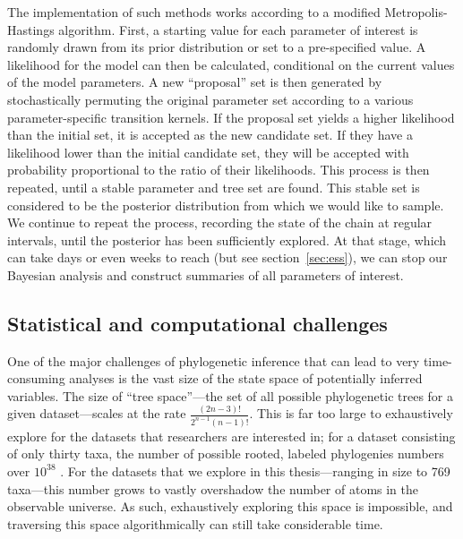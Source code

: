 The implementation of such methods works according to a modified Metropolis-Hastings algorithm. 
First, a starting value for each parameter of interest is randomly drawn from its prior distribution or set to a pre-specified value.
A likelihood for the model can then be calculated, conditional on the current values of the model parameters.
A new ``proposal'' set is then generated by stochastically permuting the original parameter set according to a various parameter-specific transition kernels.
If the proposal set yields a higher likelihood than the initial set, it is accepted as the new candidate set.
If they have a likelihood lower than the initial candidate set, they will be accepted with probability proportional to the ratio of their likelihoods.
This process is then repeated, until a stable parameter and tree set are found.
This stable set is considered to be the posterior distribution from which we would like to sample.
We continue to repeat the process, recording the state of the chain at regular intervals, until the posterior has been sufficiently explored.
At that stage, which can take days or even weeks to reach (but see section~\ref{sec:ess}), we can stop our Bayesian analysis and construct summaries of all parameters of interest.

\subsection{Statistical and computational challenges}

One of the major challenges of phylogenetic inference that can lead to very time-consuming analyses is the vast size of the state space of potentially inferred variables.
The size of ``tree space''---the set of all possible phylogenetic trees for a given dataset---scales at the rate $\frac{(2n-3)!}{2^{n-1}(n-1)!}$.
This is far too large to exhaustively explore for the datasets that researchers are interested in; for a dataset consisting of only thirty taxa, the number of possible rooted, labeled phylogenies numbers over $10^{38}$ \cite{felsenstein2003inferring}.
For the datasets that we explore in this thesis---ranging in size to 769 taxa---this number grows to vastly overshadow the number of atoms in the observable universe.
As such, exhaustively exploring this space is impossible, and traversing this space algorithmically can still take considerable time.

